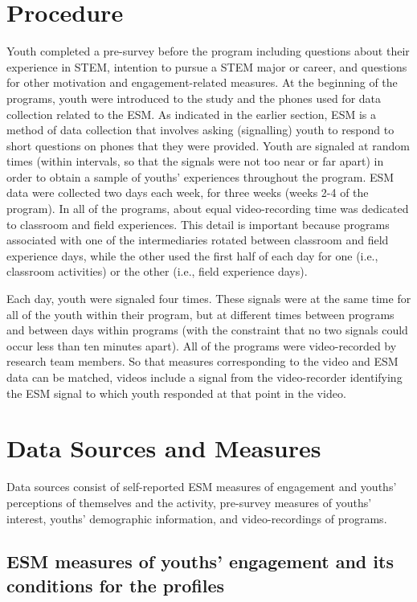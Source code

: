 \documentclass[]{book}
\theoremstyle{definition}
\theoremstyle{definition}
\theoremstyle{definition}
\theoremstyle{remark}
\begin{document}
\section{Procedure}\label{procedure}

Youth completed a pre-survey before the program including questions
about their experience in STEM, intention to pursue a STEM major or
career, and questions for other motivation and engagement-related
measures. At the beginning of the programs, youth were introduced to the
study and the phones used for data collection related to the ESM. As
indicated in the earlier section, ESM is a method of data collection
that involves asking (signalling) youth to respond to short questions on
phones that they were provided. Youth are signaled at random times
(within intervals, so that the signals were not too near or far apart)
in order to obtain a sample of youths' experiences throughout the
program. ESM data were collected two days each week, for three weeks
(weeks 2-4 of the program). In all of the programs, about equal
video-recording time was dedicated to classroom and field experiences.
This detail is important because programs associated with one of the
intermediaries rotated between classroom and field experience days,
while the other used the first half of each day for one (i.e., classroom
activities) or the other (i.e., field experience days).

Each day, youth were signaled four times. These signals were at the same
time for all of the youth within their program, but at different times
between programs and between days within programs (with the constraint
that no two signals could occur less than ten minutes apart). All of the
programs were video-recorded by research team members. So that measures
corresponding to the video and ESM data can be matched, videos include a
signal from the video-recorder identifying the ESM signal to which youth
responded at that point in the video.

\section{Data Sources and Measures}\label{data-sources-and-measures}

Data sources consist of self-reported ESM measures of engagement and
youths' perceptions of themselves and the activity, pre-survey measures
of youths' interest, youths' demographic information, and
video-recordings of programs.

\subsection{ESM measures of youths' engagement and its conditions for
the
profiles}\label{esm-measures-of-youths-engagement-and-its-conditions-for-the-profiles}
\end{document}
